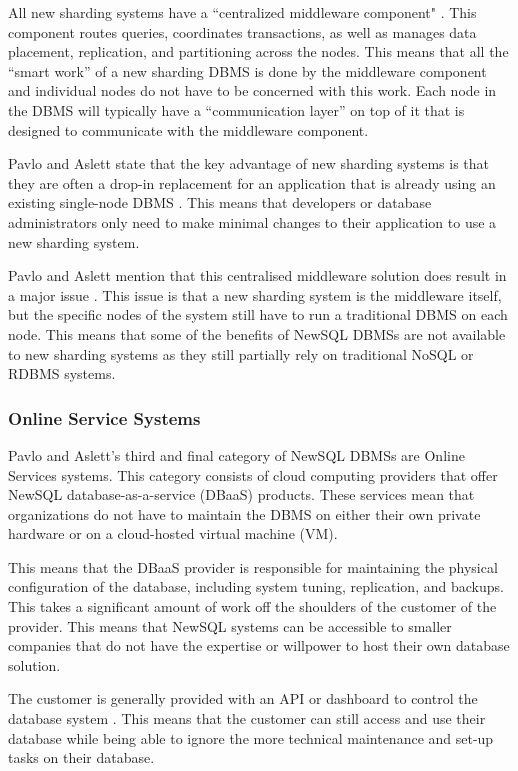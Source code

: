 \documentclass[10pt, conference]{IEEEtran}
\begin{document}
All new sharding systems have a ``centralized middleware component"  \cite{pavlo}. This component routes queries, coordinates transactions, as well as manages data placement, replication, and partitioning across the nodes. This means that all the ``smart work'' of a new sharding DBMS is done by the middleware component and individual nodes do not have to be concerned with this work. Each node in the DBMS will typically have a ``communication layer'' on top of it that is designed to communicate with the middleware component.

Pavlo and Aslett state that the key advantage of new sharding systems is that they are often a drop-in replacement for an application that is already using an existing single-node DBMS  \cite{pavlo}. This means that developers or database administrators only need to make minimal changes to their application to use a new sharding system.

Pavlo and Aslett mention that this centralised middleware solution does result in a major issue  \cite{pavlo}. This issue is that a new sharding system is the middleware itself, but the specific nodes of the system still have to run a traditional DBMS on each node. This means that some of the benefits of NewSQL DBMSs are not available to new sharding systems as they still partially rely on traditional NoSQL or RDBMS systems.

\subsubsection{Online Service Systems}

Pavlo and Aslett's third and final category of NewSQL DBMSs are Online Services systems. This category consists of cloud computing providers that offer NewSQL database-as-a-service (DBaaS) products. These services mean that organizations do not have to maintain the DBMS on either their own private hardware or on a cloud-hosted virtual machine (VM).

This means that the DBaaS provider is responsible for maintaining the physical configuration of the database, including system tuning, replication, and backups. This takes a significant amount of work off the shoulders of the customer of the provider. This means that NewSQL systems can be accessible to smaller companies that do not have the expertise or willpower to host their own database solution.

The customer is generally provided with an API or dashboard to control the database system  \cite{pavlo}. This means that the customer can still access and use their database while being able to ignore the more technical maintenance and set-up tasks on their database. 
\end{document}
